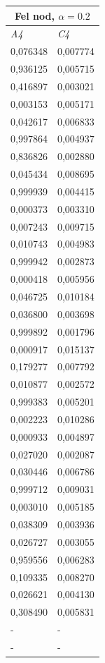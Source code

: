 \documentclass[a4paper,10pt]{article}
\begin{document}
\begin{centering}
{%


\begin{tabular}{| l | l| }
\hline
\multicolumn{2}{|c|}{Fel nod, $\alpha=0.2$ }\\ \hline
\emph{A4} & \emph{C4} \\ \hline
0,076348 & 0,007774 \\ \hline
0,936125 & 0,005715 \\ \hline
0,416897 & 0,003021 \\ \hline
0,003153 & 0,005171 \\ \hline
0,042617 & 0,006833 \\ \hline
0,997864 & 0,004937 \\ \hline
0,836826 & 0,002880 \\ \hline
0,045434 & 0,008695 \\ \hline
0,999939 & 0,004415 \\ \hline
0,000373 & 0,003310 \\ \hline
0,007243 & 0,009715 \\ \hline
0,010743 & 0,004983 \\ \hline
0,999942 & 0,002873 \\ \hline
0,000418 & 0,005956 \\ \hline
0,046725 & 0,010184 \\ \hline
0,036800 & 0,003698 \\ \hline
0,999892 & 0,001796 \\ \hline
0,000917 & 0,015137 \\ \hline
0,179277 & 0,007792 \\ \hline
0,010877 & 0,002572 \\ \hline
0,999383 & 0,005201 \\ \hline
0,002223 & 0,010286 \\ \hline
0,000933 & 0,004897 \\ \hline
0,027020 & 0,002087 \\ \hline
0,030446 & 0,006786 \\ \hline
0,999712 & 0,009031 \\ \hline
0,003010 & 0,005185 \\ \hline
0,038309 & 0,003936 \\ \hline
0,026727 & 0,003055 \\ \hline
0,959556 & 0,006283 \\ \hline
0,109335 & 0,008270 \\ \hline
0,026621 & 0,004130 \\ \hline\hline
0,308490 & 0,005831  \\ \hline
- & - \\ \hline
- & - \\ \hline
\end{tabular}
}


\end{centering}
\end{document}
